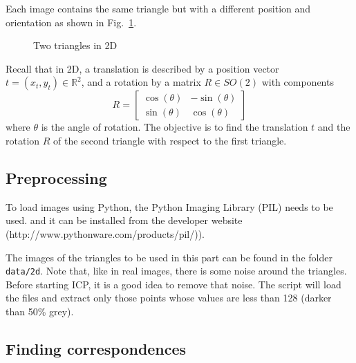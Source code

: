 \documentclass[a4paper,11pt]{article}
\begin{document}
Each image contains the same triangle but with a
different position and orientation as shown in Fig.~\ref{fig:triangles}.
\begin{figure} [ht]
  \centering \footnotesize
   \hspace{2cm}
  \caption{Two triangles in 2D}
  \label{fig:triangles}
\end{figure}
Recall that in 2D, a translation is described by a position vector
$t=(x_{t},y_{t}) \in \mathbb{R}^2$, and a rotation by a matrix $R \in SO(2)$
with components
\begin{equation*}
  R = \begin{bmatrix} 
    \cos(\theta) & -\sin(\theta) \\ 
    \sin(\theta) & \cos(\theta)
\end{bmatrix}
\end{equation*}
where $\theta$ is the angle of rotation. The objective is to find the
translation $t$ and the rotation $R$ of the second triangle with respect to the
first triangle.


\subsection{Preprocessing} 

To load images using Python, the Python Imaging Library (PIL) needs to be used.
and it can be installed from the developer website (http://www.pythonware.com/products/pil/)).

The images of the triangles
to be used in this part can be found in the folder \texttt{data/2d}.  Note that,
like in real images,
there is some noise around the triangles.  Before starting ICP, it is a good
idea to remove that noise.  The script will load the files and extract only those
points whose values are less than 128 (darker than 50\% grey).

\subsection{Finding correspondences} 
\end{document}
